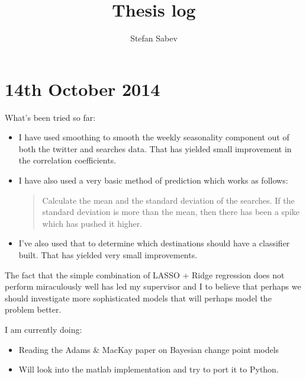 \documentclass[11pt]{amsart}
\title{Thesis log}
\author{Stefan Sabev}
\begin{document}
\maketitle

\section{14th October 2014}

What's been tried so far:

\begin{itemize}
\item I have used smoothing to smooth the weekly seasonality component out of both the twitter and searches data.
That has yielded small improvement in the correlation coefficients.
\item I have also used a very basic method of prediction which works as follows:
\begin{quotation}
Calculate the mean and the standard deviation of the searches.
If the standard deviation is more than the mean, then there has been a spike which has pushed it higher.
\end{quotation}
\item I've also used that to determine which destinations should have a classifier built. That has yielded very small improvements.
\end{itemize}


The fact that the simple combination of LASSO + Ridge regression does not perform miraculously well has led my supervisor and I to believe that perhaps we should investigate more sophisticated models that will perhaps model the problem better.

I am currently doing:

\begin{itemize}
\item Reading the Adams \& MacKay paper on Bayesian change point models
\item Will look into the matlab implementation and try to port it to Python.
\end{itemize}
\end{document}
